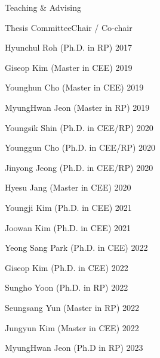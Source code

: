 \begin{rSection}{Teaching \& Advising}

\begin{rSubsection}{Thesis Committee}{}{Chair / Co-chair }{}
  \item Hyunchul Roh (Ph.D. in \ac{RP}) \hfill 2017
  \item Giseop Kim (Master in \ac{CEE}) \hfill 2019
  \item Younghun Cho (Master in \ac{CEE}) \hfill 2019
  \item MyungHwan Jeon (Master in \ac{RP}) \hfill 2019
  \item Youngsik Shin (Ph.D. in \ac{CEE}/\ac{RP}) \hfill 2020
  \item Younggun Cho (Ph.D. in \ac{CEE}/\ac{RP}) \hfill 2020
  \item Jinyong Jeong (Ph.D. in \ac{CEE}/\ac{RP}) \hfill 2020
  \item Hyesu Jang (Master in \ac{CEE}) \hfill 2020
  \item Youngji Kim (Ph.D. in \ac{CEE}) \hfill 2021
  \item Joowan Kim (Ph.D. in \ac{CEE}) \hfill 2021
  \item Yeong Sang Park (Ph.D. in \ac{CEE}) \hfill 2022
  \item Giseop Kim (Ph.D. in \ac{CEE}) \hfill 2022
  \item Sungho Yoon (Ph.D. in \ac{RP}) \hfill 2022
  \item Seungsang Yun (Master in \ac{RP}) \hfill 2022
  \item Jungyun Kim (Master in \ac{CEE}) \hfill 2022
  \item MyungHwan Jeon (Ph.D in \ac{RP}) \hfill 2023
\end{rSubsection}

\end{rSection}
